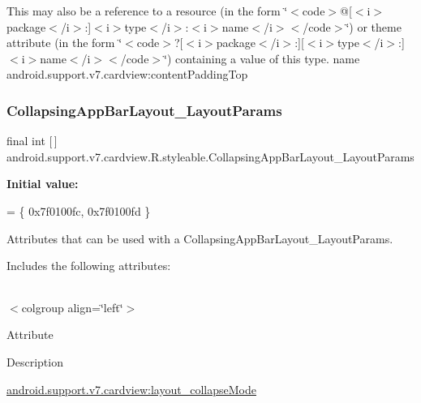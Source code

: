 This may also be a reference to a resource (in the form \char`\"{}$<$code$>$@\mbox{[}$<$i$>$package$<$/i$>$\+:\mbox{]}$<$i$>$type$<$/i$>$\+:$<$i$>$name$<$/i$>$$<$/code$>$\char`\"{}) or theme attribute (in the form \char`\"{}$<$code$>$?\mbox{[}$<$i$>$package$<$/i$>$\+:\mbox{]}\mbox{[}$<$i$>$type$<$/i$>$\+:\mbox{]}$<$i$>$name$<$/i$>$$<$/code$>$\char`\"{}) containing a value of this type.  name android.\+support.\+v7.\+cardview\+:content\+Padding\+Top \mbox{\label{classandroid_1_1support_1_1v7_1_1cardview_1_1R_1_1styleable_a16f17ad190df56abdfbfa11e42898369}} 
\subsubsection{\texorpdfstring{Collapsing\+App\+Bar\+Layout\+\_\+\+Layout\+Params}{CollapsingAppBarLayout\_LayoutParams}}
{\footnotesize\ttfamily final int \mbox{[}$\,$\mbox{]} android.\+support.\+v7.\+cardview.\+R.\+styleable.\+Collapsing\+App\+Bar\+Layout\+\_\+\+Layout\+Params\hspace{0.3cm}{\ttfamily [static]}}

{\bfseries Initial value\+:}
\begin{DoxyCode}
= \{
            0x7f0100fc, 0x7f0100fd
        \}
\end{DoxyCode}
Attributes that can be used with a Collapsing\+App\+Bar\+Layout\+\_\+\+Layout\+Params. 

Includes the following attributes\+:

\tabulinesep=1mm
\begin{longtabu} spread 0pt [c]{*{0}{|X[-1]}|}
\hline
\end{longtabu}
$<$colgroup align=\char`\"{}left\char`\"{}$>$ 

Attribute

Description 

{\ttfamily \hyperlink{classandroid_1_1support_1_1v7_1_1cardview_1_1R_1_1styleable_a96f22ebb139de6418b43c78b653af717}{android.\+support.\+v7.\+cardview\+:layout\+\_\+collapse\+Mode}}

